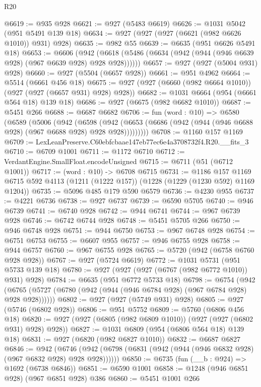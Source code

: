 \begin{lexlean}{R20}
\begin{coremodule}
@6619 := @935 @928
@6621 := @927 (@5483 @6619)
@6626 := @1031 @5042 (@951 @5491 @139 @18)
@6634 := @927 (@927 (@927 (@6621 (@982 @6626 @1010)) @931) @928)
@6635 := @982 @55
@6639 := @6635 (@951 @6626 @5491 @18)
@6653 := @6606
    (@942 (@6618 (@5486 (@6634 (@942 (@944 (@946 @6639 @928) (@967 @6639 @928) @928 @928))))))
@6657 := @927 (@927 (@5004 @931) @928)
@6660 := @927 (@5504 (@6657 @928))
@6661 := @951 @4962
@6664 := @5514 (@6661 @456 @18)
@6675 := @927 (@927 (@6660 (@982 @6664 @1010)) (@927 (@927 (@6657 @931) @928) @928))
@6682 := @1031 @6664 (@954 (@6661 @564 @18) @139 @18)
@6686 := @927 (@6675 (@982 @6682 @1010))
@6687 := @5451 @266
@6688 := @6687 @6682
@6706 := fun (word : @10) =>
  @6580
    (@6589
      (@5006
        (@942
          (@6598
            (@942 (@6653 (@6686 (@942 (@944 (@946 @6688 @928) (@967 @6688 @928) @928 @928)))))))))
@6708 := @1160 @157 @1169
@6709 := LexLeanPreserve.C60ebfcbaae147eb77ec6e4a3708732f4.R20.__fits_3
@6710 := @6709 @1001
@6711 := @1172 @6710
@6712 := VerdantEngine.SmallFloat.encodeUnsigned
@6715 := @6711 (@51 (@6712 @1001))
@6717 := (word : @10) -> @6708 @6715
@6731 := @1186
    @157
    @1169
    @6715
    @592
    @4113
    (@1211 (@1222 @157))
    (@1228 (@1229 (@1230 @592) @1169 @1204))
@6735 := @5096 @485 @179 @590 @6579
@6736 := @4230 @955
@6737 := @4221 @6736
@6738 := @927 @6737
@6739 := @6590 @5705
@6740 := @946 @6739
@6741 := @6740 @928
@6742 := @944 @6741
@6744 := @967 @6739 @928
@6746 := @6742 @6744 @928
@6748 := @5451 @5705 @266
@6750 := @946 @6748 @928
@6751 := @944 @6750
@6753 := @967 @6748 @928
@6754 := @6751 @6753
@6755 := @6607 @955
@6757 := @946 @6755 @928
@6758 := @944 @6757
@6760 := @967 @6755 @928
@6765 := @5720 (@942 (@6758 @6760 @928 @928))
@6767 := @927 (@5724 @6619)
@6772 := @1031 @5731 (@951 @5733 @139 @18)
@6780 := @927 (@927 (@927 (@6767 (@982 @6772 @1010)) @931) @928)
@6784 := @6635 (@951 @6772 @5733 @18)
@6798 := @6754
    (@942 (@6765 (@5727 (@6780 (@942 (@944 (@946 @6784 @928) (@967 @6784 @928) @928 @928))))))
@6802 := @927 (@927 (@5749 @931) @928)
@6805 := @927 (@5746 (@6802 @928))
@6806 := @951 @5752
@6809 := @5760 (@6806 @456 @18)
@6820 := @927 (@927 (@6805 (@982 @6809 @1010)) (@927 (@927 (@6802 @931) @928) @928))
@6827 := @1031 @6809 (@954 (@6806 @564 @18) @139 @18)
@6831 := @927 (@6820 (@982 @6827 @1010))
@6832 := @6687 @6827
@6846 := @942
    (@6746 (@942 (@6798 (@6831 (@942 (@944 (@946 @6832 @928) (@967 @6832 @928) @928 @928))))))
@6850 := @6735 (fun (__b : @924) => @1692 (@6738 @6846))
@6851 := @6590 @1001
@6858 := @1248 (@946 @6851 @928) (@967 @6851 @928) @386
@6860 := @5451 @1001 @266

\end{coremodule}
\end{lexlean}
